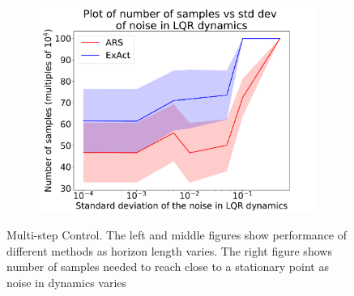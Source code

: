 \begin{figure}[t]
\begin{subfigure}{0.32\linewidth}
    \includegraphics[width=\linewidth]{figures/aistats19/plt_lqr.pdf}\label{fig:lqr}
  \end{subfigure}
  \caption{Multi-step Control. The left and middle figures show
    performance of different methods as horizon length varies. The
    right figure shows number of samples needed to reach
    close to a stationary point as noise in dynamics varies}
  \label{fig:multistep}
\end{figure}

%
%
%
%
%
%
%
%

%
%
%
%
%
%
%



